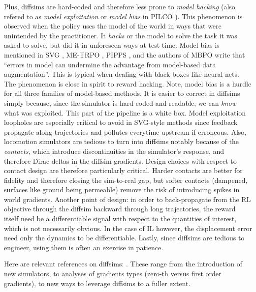 \documentclass[12pt,a4paper]{article}
\begin{document}
Plus, diffsims are hard-coded and therefore less prone to \textit{model hacking} (also refered
to as \textit{model exploitation} \cite{Ross2012-yj}
or \textit{model bias} in PILCO \cite{Deisenroth2011-ya}).
This phenomenon is observed when the policy uses the model of the world in ways that were
unintended by the practitioner. It \textit{hacks} or  the model to solve the task
it was asked to solve, but did it in unforeseen ways at test time.
Model bias is mentioned in SVG \cite{Heess2015-va}, ME-TRPO \cite{Kurutach2018-lw},
PIPPS \cite{Parmas2018-se}, and the authors of MBPO \cite{Janner2019-sk} write that
``errors in model can undermine the advantage from model-based data augmentation''.
This is typical when dealing with black boxes like neural nets.
The phenomenon is close in spirit to reward hacking.
Note, model bias is a hurdle for all three families of model-based methods.
It is easier to correct in diffsims simply because, since the simulator is hard-coded and readable,
we can \textit{know} what was exploited. This part of the pipeline is a white box.
Model exploitation loopholes are especially critical to avoid in SVG-style methods since
feedback propagate along trajectories and pollutes everytime upstream if erroneous.
Also, locomotion simulators are tedious to turn into diffsims notably because of the
\emph{contacts}, which introduce discontinuities in the simulator's response, and therefore
Dirac deltas in the diffsim gradients.
Design choices with respect to contact design are therefore particularly critical.
Harder contacts are better for fidelity and therefore closing the sim-to-real gap,
but softer contacts (dampened, surfaces like ground being permeable) remove the risk of introducing
spikes in world gradients.
Another point of design: in order to back-propagate from the RL objective through the diffsim
backward through long trajectories, the reward itself need be a differentiable signal
with respect to the quantities of interest, which is not necessarily obvious.
In the case of IL however, the displacement error need only the dynamics to be differentiable.
Lastly, since diffsims are tedious to engineer, using them is often an exercise in patience.

Here are relevant references on diffsims:
\cite{Degrave2016-vr, Hu2019-ax, Falisse2019-ge, Hu2020-eb, Qiao2020-um, Gradu2020-kq,
Geilinger2020-ar, Mora2021-pp, Heiden2021-fb, Clarke2021-rr, Werling2021-da, Qiao2021-zn,
Huang2021-le, Heiden2021-ey, Grinsztajn2021-mr, Daniel_Freeman2021-az, Lin2022-jr, Xu2022-bz,
Suh2022-mn, Allen2022-vc, Chen2022-zd, Ren2023-yc, Georgiev2024-rs}.
These range from the introduction of new simulators, to analyses of gradients types
(zero-th versus first order gradients), to new ways to leverage diffsims to a fuller extent.
\end{document}
